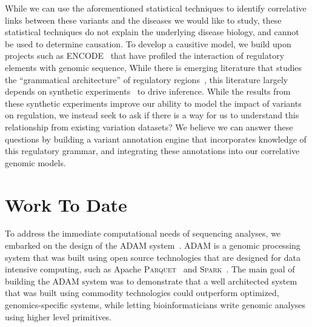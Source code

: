 \documentclass[11pt]{article} %
\begin{document}
While we can use the aforementioned statistical techniques to identify correlative links
between these variants and the diseases we would like to study, these statistical techniques
do not explain the underlying disease biology, and cannot be used to determine causation.
To develop a causitive model, we build upon projects such as ENCODE~\cite{gerstein12} that
have profiled the interaction of regulatory elements with genomic sequence, While there is
emerging literature that studies the ``grammatical architecture'' of regulatory
regions~\cite{levo14, weingarten14}, this literature largely depends on synthetic
experiments~\cite{sharon12} to drive inference. While the results from these synthetic
experiments improve our ability to model the impact of variants
on regulation, we instead seek to ask if there is a way for us to understand this relationship
from existing variation datasets? We believe we can answer these questions by building a variant
annotation engine that incorporates knowledge of this regulatory grammar, and integrating
these annotations into our correlative genomic models.

\section{Work To Date}

To address the immediate computational needs of sequencing analyses, we embarked on the design of
the \textsc{ADAM} system~\cite{massie13, nothaft15}. \textsc{ADAM} is a genomic processing system
that was built using open source technologies that are designed for data intensive computing, such
as Apache \textsc{Parquet}~\cite{parquet} and \textsc{Spark}~\cite{zaharia12, zaharia10}. The main
goal of building the \textsc{ADAM} system was to demonstrate that a well architected system that
was built using commodity technologies could outperform optimized, genomics-specific systems,
while letting bioinformaticians write genomic analyses using higher level primitives.
\end{document}
